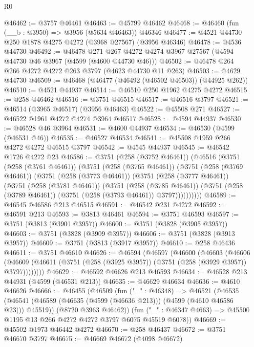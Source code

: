 \begin{lexlean}{R0}
\begin{coremodule}
@46462 := @3757 @46461
@46463 := @45799 @46462
@46468 := @46460 (fun (__b : @3950) => @3956 (@5634 @46463)) @46346
@46477 := @4521 @44730 @250 @1878 @4275 @4272 (@3968 @27567) (@3956 @46346)
@46478 := @4536 @44730
@46492 := @46478
    @271
    @267
    @4272
    @4274
    @3967
    @27567
    (@4594 @44730 @46 @3967 (@4599 (@4600 @44730 @46)))
@46502 := @46478 @264 @266 @4272 @4272 @263 @3797 (@4623 @44730 @11 @263)
@46503 := @4629 @44730
@46509 := @46468 (@46477 (@46492 (@46502 @46503)) (@44925 @262))
@46510 := @4521 @44937
@46514 := @46510 @250 @1962 @4275 @4272
@46515 := @258 @46462
@46516 := @3751 @46515
@46517 := @46516 @3797
@46521 := @46514 (@3965 @46517) (@3956 @46463)
@46522 := @45508 @271
@46527 := @46522 @1961 @4272 @4274 @3964 @46517
@46528 := @4594 @44937
@46530 := @46528 @46 @3964
@46531 := @4600 @44937
@46534 := @46530 (@4599 (@46531 @46))
@46535 := @46527 @46534
@46541 := @45508 @1959 @266 @4272 @4272 @46515 @3797
@46542 := @4545 @44937
@46545 := @46542 @1726 @4272 @23
@46586 := @3751
    (@258 (@3752 @46461))
    (@46516
      (@3751
        (@258 (@3761 @46461))
        (@3751
          (@258 (@3765 @46461))
          (@3751
            (@258 (@3769 @46461))
            (@3751
              (@258 (@3773 @46461))
              (@3751
                (@258 (@3777 @46461))
                (@3751
                  (@258 (@3781 @46461))
                  (@3751
                    (@258 (@3785 @46461))
                    (@3751 (@258 (@3789 @46461)) (@3751 (@258 (@3793 @46461)) @3797))))))))))
@46589 := @46545 @46586 @213 @46515
@46591 := @46542 @231 @4272
@46592 := @46591 @213
@46593 := @3813 @46461
@46594 := @3751 @46593
@46597 := @3751 (@3813 (@3901 @3957))
@46600 := @3751 (@3828 (@3905 @3957))
@46603 := @3751 (@3828 (@3909 @3957))
@46606 := @3751 (@3828 (@3913 @3957))
@46609 := @3751 (@3813 (@3917 @3957))
@46610 := @258 @46436
@46611 := @3751 @46610
@46626 := @46594
    (@46597
      (@46600
        (@46603
          (@46606
            (@46609 (@46611 (@3751 (@258 (@3925 @3957)) (@3751 (@258 (@3929 @3957)) @3797))))))))
@46629 := @46592 @46626 @213 @46593
@46634 := @46528 @213 @44931 (@4599 (@46531 @213))
@46635 := @46629 @46634
@46636 := @4610 @46626
@46666 := @46455
    (@46509
      (fun ("_" : @46348) =>
      @46521
        (@46535 (@46541 (@46589 (@46635 (@4599 (@46636 @213))) (@4599 (@4610 @46586 @23))) @45519))
        (@8720 @3963 @46462))
      (fun ("_" : @46347 @4663) => @45500 @1195 @13 @266 @4272 @4272 @3797 @6075 @45519 @6078))
@46669 := @45502 @1973 @46442 @4272
@46670 := @258 @46437
@46672 := @3751 @46670 @3797
@46675 := @46669 @46672 (@4098 @46672)

\end{coremodule}
\end{lexlean}
